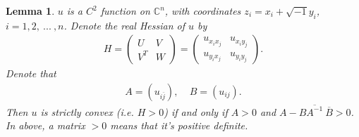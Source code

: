\documentclass{article}
\newtheorem{lemma}[theorem]{Lemma}
\numberwithin{equation}{section}
\newcommand{\EC}{\mathbb{C}}
\newcommand{\ijbar}{{i\overline j}}
\begin{document}
\begin{lemma}
	\label{lemma}
	 $u$ is a $C^2$ function on $\EC^n$, with coordinates $z_i=x_i+\sqrt{-1}y_i$, $i=1,2,\ ...\ ,n$. Denote the real Hessian of $u$ by 
	  \begin{align}
	  	  H=
	  	  \left(\begin{array}{cc}  U&V\\
	  	  V^T& W
	  	  \end{array}
	  	  \right)
	  	  =
	  	  \left(\begin{array}{cc}  u_{x_i x_j}& u_{x_i y_j}\\
	  	  	                                         u_{y_i x_j}& u_{y_i y_j}
	  	  	          \end{array}
	  	  \right).
	  \end{align}
	  Denote that 
	  \begin{align}
	  	A=\left(
	  	   u_{\ijbar}
	  	\right), \ \ \ \ \ B=\left(
	  	u_{ij}
	  	\right).
	  \end{align}
	  Then $u$ is strictly convex (i.e. $H>0$) if and only if $A>0$ and $A-B\overline{A^{-1}}\ \overline B>0$. In above, a matrix $>0$ means that it's positive definite.
\end{lemma}
\end{document}
